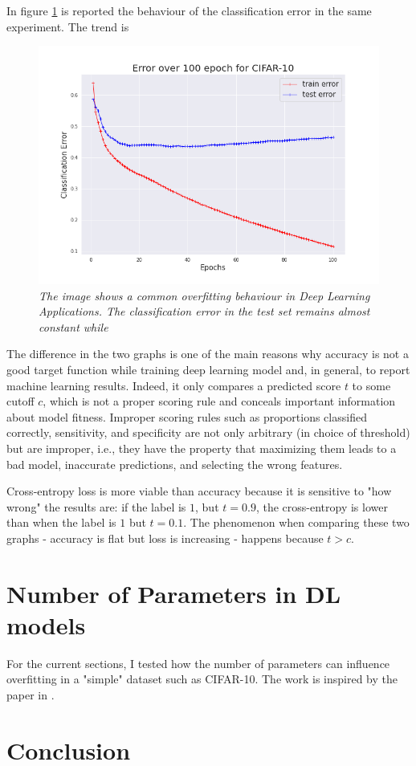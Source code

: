 \documentclass[11pt,a4paper]{article}
\begin{document}
In figure \ref{cifar-overfit-error} is reported the behaviour of the classification error in the same experiment. The trend is 

\begin{figure}[H]
  \centering
  \includegraphics[scale=0.4]{../images/cifar10_100epochs_error.png}
  \caption{\textit{The image shows a common overfitting behaviour in Deep Learning Applications. The classification error in the test set remains almost constant while }}
  \label{cifar-overfit-error}
\end{figure}

The difference in the two graphs is one of the main reasons why accuracy is not a good target function while training deep learning model and, in general, to report machine learning results. Indeed, it only compares a predicted score $t$ to some cutoff $c$, which is not a proper scoring rule and conceals important information about model fitness.
Improper scoring rules such as proportions classified correctly, sensitivity, and specificity are not only arbitrary (in choice of threshold) but are improper, i.e., they have the property that maximizing them leads to a bad model, inaccurate predictions, and selecting the wrong features. 

Cross-entropy loss is more viable than accuracy because it is sensitive to "how wrong" the results are: if the label is $1$, but $t=0.9$, the cross-entropy is lower than when the label is $1$ but $t=0.1$.
The phenomenon when comparing these two graphs - accuracy is flat but loss is increasing - happens because $t>c$.

\section*{Number of Parameters in DL models}

For the current sections, I tested how the number of parameters can influence overfitting in a "simple" dataset such as CIFAR-10. 
The work is inspired by the paper in \cite{Mit-overfit}. 

\section*{Conclusion}


\newpage
\nocite{*}



\end{document}
